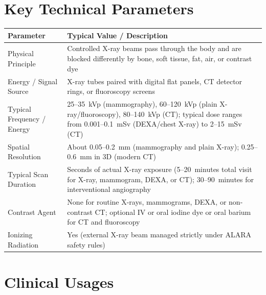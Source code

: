 \section{Key Technical Parameters}
\noindent
\begin{tabularx}{\textwidth}{@{}l X@{}}
\toprule
\textbf{Parameter} & \textbf{Typical Value / Description} \\
\midrule
Physical Principle & Controlled X-ray beams pass through the body and are blocked differently by bone, soft tissue, fat, air, or contrast dye \\
Energy / Signal Source & X-ray tubes paired with digital flat panels, CT detector rings, or fluoroscopy screens \\
Typical Frequency / Energy & 25--35~kVp (mammography), 60--120~kVp (plain X-ray/fluoroscopy), 80--140~kVp (CT); typical dose ranges from 0.001--0.1~mSv (DEXA/chest X-ray) to 2--15~mSv (CT) \\
Spatial Resolution & About 0.05--0.2~mm (mammography and plain X-ray); 0.25--0.6~mm in 3D (modern CT) \\
Typical Scan Duration & Seconds of actual X-ray exposure (5--20~minutes total visit for X-ray, mammogram, DEXA, or CT); 30--90~minutes for interventional angiography \\
Contrast Agent & None for routine X-rays, mammograms, DEXA, or non-contrast CT; optional IV or oral iodine dye or oral barium for CT and fluoroscopy \\
Ionizing Radiation & Yes (external X-ray beam managed strictly under ALARA safety rules) \\
\bottomrule
\end{tabularx}

\section{Clinical Usages}


